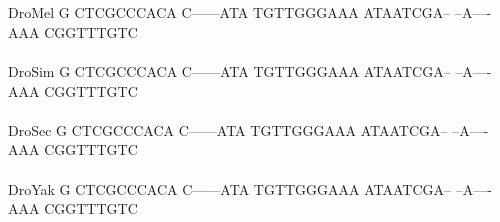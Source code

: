 \documentclass[11pt,twoside,reqno,a4paper]{article}
\begin{document}
{\hspace*{7\charwidth}\hspace*{1\charwidth}\hspace*{1\charwidth}\hspace*{1\charwidth}\hspace*{1\charwidth}\hspace*{1\charwidth}\hspace*{1\charwidth}\\
\\
DroMel	G	CTCGCCCACA	C------ATA	TGTTGGGAAA	ATAATCGA--	--A----AAA	CGGTTTGTC\\
\hspace*{7\charwidth}\hspace*{1\charwidth}\hspace*{1\charwidth}\hspace*{1\charwidth}\hspace*{1\charwidth}\hspace*{1\charwidth}\hspace*{1\charwidth}\\
DroSim	G	CTCGCCCACA	C------ATA	TGTTGGGAAA	ATAATCGA--	--A----AAA	CGGTTTGTC\\
\hspace*{7\charwidth}\hspace*{1\charwidth}\hspace*{1\charwidth}\hspace*{1\charwidth}\hspace*{1\charwidth}\hspace*{1\charwidth}\hspace*{1\charwidth}\\
DroSec	G	CTCGCCCACA	C------ATA	TGTTGGGAAA	ATAATCGA--	--A----AAA	CGGTTTGTC\\
\hspace*{7\charwidth}\hspace*{1\charwidth}\hspace*{1\charwidth}\hspace*{1\charwidth}\hspace*{1\charwidth}\hspace*{1\charwidth}\hspace*{1\charwidth}\\
DroYak	G	CTCGCCCACA	C------ATA	TGTTGGGAAA	ATAATCGA--	--A----AAA	CGGTTTGTC\\
\hspace*{7\charwidth}\hspace*{1\charwidth}\hspace*{1\charwidth}\hspace*{1\charwidth}\hspace*{1\charwidth}\hspace*{1\charwidth}\hspace*{1\charwidth}\\
}
\end{document}
